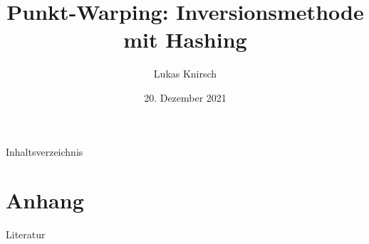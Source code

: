 \documentclass{sdqbeamer}
\title[Punkt-Warping]{Punkt-Warping: Inversionsmethode mit Hashing}
\author[Lukas Knirsch]{Lukas Knirsch}
\date[20.\,12.\,2021]{20. Dezember 2021}
\begin{document}
\KITtitleframe

\begin{frame}{Inhaltsverzeichnis}
	\tableofcontents
\end{frame}

% 







\appendix
\beginbackup

\section{Anhang}

\begin{frame}{Literatur}
	\printbibliography
\end{frame}

\backupend
\end{document}
